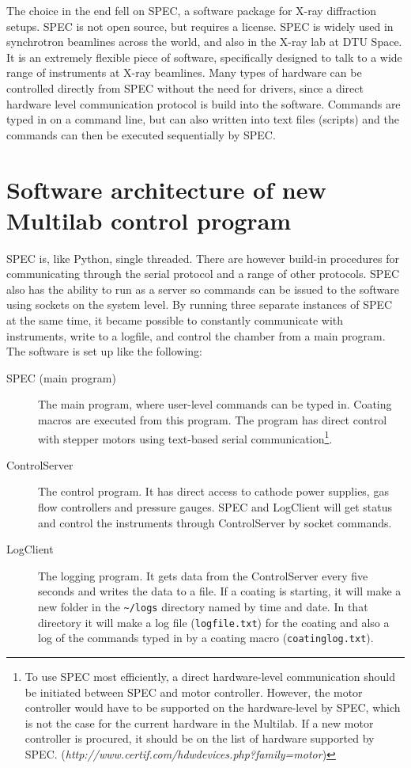 The choice in the end fell on SPEC, a software package for X-ray diffraction setups. SPEC is not open source, but requires a license. SPEC is widely used in synchrotron beamlines across the world, and also in the X-ray lab at DTU Space. It is an extremely flexible piece of software, specifically designed to talk to a wide range of instruments at X-ray beamlines. Many types of hardware can be controlled directly from SPEC without the need for drivers, since a direct hardware level communication protocol is build into the software. Commands are typed in on a command line, but can also written into text files (scripts) and the commands can then be executed sequentially by SPEC.

\section{Software architecture of new Multilab control program}
SPEC is, like Python, single threaded. There are however build-in procedures for communicating through the serial protocol and a range of other protocols. SPEC also has the ability to run as a server so commands can be issued to the software using sockets on the system level. By running three separate instances of SPEC at the same time, it became possible to constantly communicate with instruments, write to a logfile, and control the chamber from a main program. The software is set up like the following:

\begin{description}
  \item[SPEC (main program)] The main program, where user-level commands can be typed in. Coating macros are executed from this program. The program has direct control with stepper motors using text-based serial communication\footnote{To use SPEC most efficiently, a direct hardware-level communication should be initiated between SPEC and motor controller. However, the motor controller would have to be supported on the hardware-level by SPEC, which is not the case for the current hardware in the Multilab. If a new motor controller is procured, it should be on the list of hardware supported by SPEC. (\emph{http://www.certif.com/hdwdevices.php?family=motor})}.
  \item[ControlServer] The control program. It has direct access to cathode power supplies, gas flow controllers and pressure gauges. SPEC and LogClient will get status and control the instruments through ControlServer by socket commands.
  \item[LogClient] The logging program. It gets data from the ControlServer every five seconds and writes the data to a file. If a coating is starting, it will make a new folder in the \verb'~/logs' directory named by time and date. In that directory it will make a log file (\verb'logfile.txt') for the coating and also a log of the commands typed in by a coating macro (\verb'coatinglog.txt').
\end{description}

